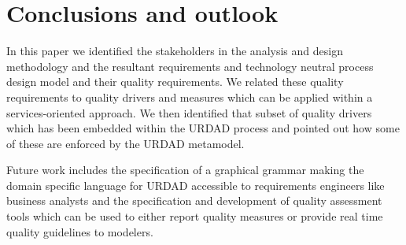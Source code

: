 \section{Conclusions and outlook}

In this paper we identified the stakeholders in the analysis and design methodology and the resultant requirements and technology neutral process design model and their quality requirements. We related these quality requirements to quality drivers and measures which can be applied within a services-oriented approach. We then identified that subset of quality drivers which has been embedded within the URDAD process and pointed out how some of these are enforced by the URDAD metamodel.

Future work includes the specification of a graphical grammar making the domain specific language for URDAD accessible to requirements engineers like business analysts and the specification and development of quality assessment tools which can be used to either report quality measures or provide real time quality guidelines to modelers.